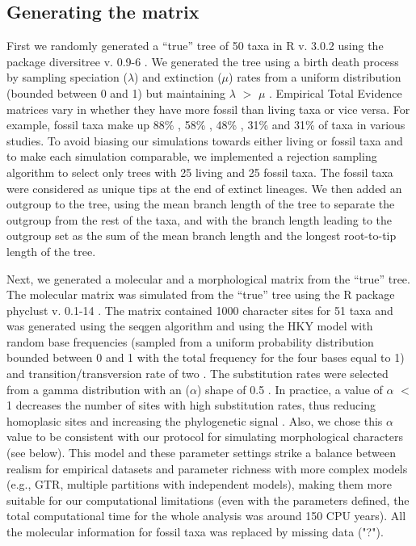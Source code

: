 \subsection{Generating the matrix}
\label{Generating_the_matrix}
First we randomly generated a ``true'' tree of 50 taxa in R v. 3.0.2 \citep{R} using the package diversitree v. 0.9-6 \citep{fitzjohndiversitree2012}.
We generated the tree using a birth death process by sampling speciation ($\lambda$) and extinction ($\mu$) rates from a uniform distribution (bounded between 0 and 1) but maintaining $\lambda$ $>$ $\mu$ \citep{paradistime-dependent2011}.
Empirical Total Evidence matrices vary in whether they have more fossil than living taxa or vice versa.
For example, fossil taxa make up 88\% \citep{beckancient2014}, 58\% \citep{schragocombining2013}, 48\% \citep{pyrondivergence2011}, 31\% \citep{ronquista2012} and 31\% \citep{slaterphylogenetic2013} of taxa in various studies.
To avoid biasing our simulations towards either living or fossil taxa and to make each simulation comparable, we implemented a rejection sampling algorithm to select only trees with 25 living and 25 fossil taxa.
The fossil taxa were considered as unique tips at the end of extinct lineages.
We then added an outgroup to the tree, using the mean branch length of the tree to separate the outgroup from the rest of the taxa, and with the branch length leading to the outgroup set as the sum of the mean branch length and the longest root-to-tip length of the tree.

Next, we generated a molecular and a morphological matrix from the ``true'' tree.
The molecular matrix was simulated from the ``true'' tree using the R package phyclust v. 0.1-14 \citep{chen2011}.
The matrix contained 1000 character sites for 51 taxa and was generated using the seqgen algorithm \citep{ranbaut1997seqgen} and using the HKY model \citep{HKY85} with random base frequencies (sampled from a uniform probability distribution bounded between 0 and 1 with the total frequency for the four bases equal to 1) and transition/transversion rate of two \citep{douadycomparison2003}.
The substitution rates were selected from a gamma distribution with an ($\alpha$) shape of 0.5 \citep{yangamong-site1996}.
In practice, a value of $\alpha$ $<$ 1 decreases the number of sites with high substitution rates, thus reducing homoplasic sites and increasing the phylogenetic signal \citep{Hassanin1998611,EstoupHomoplasy}.
Also, we chose this $\alpha$ value to be consistent with our protocol for simulating morphological characters (see below).
This model and these parameter settings strike a balance between realism for empirical datasets \citep[e.g.][]{douadycomparison2003,kellymolecular2014} and parameter richness with more complex models (e.g., GTR, multiple partitions with independent models), making them more suitable for our computational limitations (even with the parameters defined, the total computational time for the whole analysis was around 150 CPU years).
All the molecular information for fossil taxa was replaced by missing data ("?").

